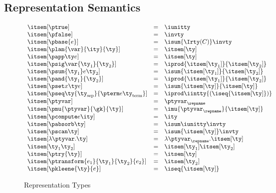 \subsection{Representation Semantics}
\label{sec:intty-sem}

\begin{figure}
\fbox{$\itsem[\ty] = \ity$}
\[
\begin{array}{lcl} 
\itsem[\ptrue] & = & \iunitty \\
\itsem[\pfalse] & = & \invty \\
\itsem[\pbase{e}] & = & \isum {\Irty(C)} \invty   \\
\itsem[\plam{\var}{\ity}{\ty}] & = & \itsem[\ty] \\
\itsem[\papp \ty e] & = & \itsem[\ty] \\
\itsem[\psig \var {\ty_1} {\ty_2}]  & = & \iprod {\itsem[\ty_1]} {\itsem[\ty_2]}    \\
\itsem[\psum {\ty_1} e {\ty_2}]     & = & \isum {\itsem[\ty_1]} {\itsem[\ty_2]} \\
\itsem[\pand {\ty_1} {\ty_2}]  & = & \iprod {\itsem[\ty_1]}{\itsem[\ty_2]}\\
\itsem[\pset x \ty e] & = & \isum {\itsem[\ty]}{\itsem[\ty]}\\
\itsem[\pseq \ty {\ty_{\text{sep}}} {\pterm e {\ty_{\text{term}}}}] & = & 
    \iprod \iintty {(\iseq{\itsem[\ty]})}             \\
\itsem[\ptyvar] & = & \ptyvar_\repname \\
\itsem[\pmu{\ptyvar}{\gk}{\ty}] & = & \imu{\ptyvar_\repname}{\itsem[\ty]} \\
\itsem[\pcompute e \ity]                 & = & \ity \\
\itsem[\pabsorb \ty]                     & = & \isum \iunitty \invty \\
\itsem[\pscan \ty] & = & \isum {\itsem[\ty]} \invty \\
\itsem[\lambda \ptyvar.\ty]       & = & \lambda \ptyvar_\repname.\itsem[\ty] \\
\itsem[\ty_1 \ty_2]              & = & \itsem[\ty_1] \itsem[\ty_2] \\
\itsem[\ptry{\ty}]    & = & \itsem[\ty] \\
\itsem[\ptransform{e_1}{\ty_1}{\ty_2}{e_2}] & = & \itsem[\ty_2]\\
\itsem[\pkleene{\ty}{e}] & = & \iseq{\itsem[\ty]}
\end{array}
\]
\caption{Representation Types}
\label{fig:rep-tys}
\end{figure}

